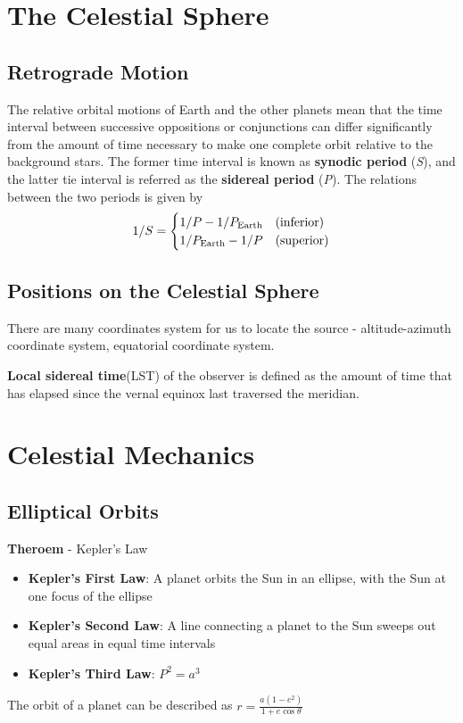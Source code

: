 \documentclass{article}
\numberwithin{equation}{section}
\numberwithin{figure}{section}
\begin{document}
\section{The Celestial Sphere}
	\subsection{Retrograde Motion}
	The relative orbital motions of Earth and the other planets mean that the time interval between successive oppositions or conjunctions can differ significantly from the amount of time necessary to make one complete orbit relative to the background stars. The former time interval is known as {\bf synodic period} ({\it S}), and the latter tie interval is referred as the {\bf sidereal period} ({\it P}). The relations between the two periods is given by
	\begin{equation}
		1/S = 
		\begin{cases}
			1/P - 1/P_{\rm Earth} & ({\rm inferior})\\
			1/P_{\rm Earth} - 1/P & ({\rm superior})
		\end{cases}
	\end{equation}
	
	\subsection{Positions on the Celestial Sphere}
	There are many coordinates system for us to locate the source - altitude-azimuth coordinate system, equatorial coordinate system. 
	
	{\bf Local sidereal time}(LST) of the observer is defined as the amount of time that has elapsed since the vernal equinox last traversed the meridian.
	

\section{Celestial Mechanics}
	\subsection{Elliptical Orbits}
	{\bf Theroem} - Kepler's Law
	\begin{itemize}
		\item {\bf Kepler's First Law}: A planet orbits the Sun in an ellipse, with the Sun at one focus of the ellipse
		\item {\bf Kepler's Second Law}: A line connecting a planet to the Sun sweeps out equal areas in equal time intervals
		\item {\bf Kepler's Third Law}: $P^2 = a^3$
	\end{itemize}
	The orbit of a planet can be described as $r = \frac{a(1-e^2)}{1+e\cos\theta}$
	
\end{document}

